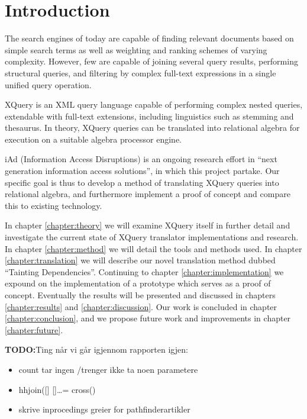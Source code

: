 \chapter{Introduction}
\label{chapter:introduction}
% 


The search engines of today are capable of finding relevant documents based
on simple search terms as well as weighting and ranking schemes of varying
complexity. However, few are capable of joining several query results,
performing structural queries, and filtering by complex full-text expressions
in a single unified query operation. 

XQuery is an XML query language capable of performing complex nested
queries, extendable with full-text extensions, including linguistics such as
stemming and thesaurus. In theory, XQuery queries can be translated into
relational algebra for execution on a suitable algebra processor engine.

iAd \cite{iadcentre} (Information Access Disruptions) is an ongoing research
effort in ``next generation information access solutions'', in which this
project partake. Our specific goal is thus to develop a method of
translating XQuery queries into relational algebra, and furthermore implement a
proof of concept and compare this to existing technology. 

In chapter \ref{chapter:theory} we will examine XQuery itself in further detail
and investigate the current state of XQuery translator implementations and
research. In chapter \ref{chapter:method} we will detail the tools and methods
used. In chapter \ref{chapter:translation} we will describe our novel
translation method dubbed ``Tainting Dependencies''. Continuing to chapter
\ref{chapter:implementation} we expound on the implementation of a prototype
which serves as a proof of concept. Eventually the results will be
presented and discussed in chapters \ref{chapter:results} and
\ref{chapter:discussion}. Our work is concluded in chapter
\ref{chapter:conclusion}, and we propose future work and improvements in
chapter \ref{chapter:future}.



\textbf{\LARGE TODO:}Ting n\aa r vi g\aa r igjennom rapporten igjen:
\begin{itemize}
  \item count tar ingen /trenger ikke ta noen parametere
  \item hhjoin([] []\ldots = cross()
  \item skrive inprocedings greier for pathfinderartikler
\end{itemize}
